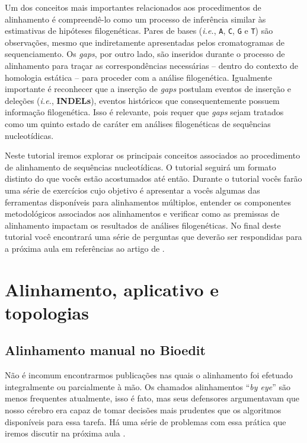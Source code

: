 \begin{refsection}
Um dos conceitos mais importantes relacionados aos procedimentos de alinhamento é compreendê-lo como um processo de inferência similar às estimativas de hipóteses filogenéticas. Pares de bases (\textit{i.e.}, \texttt{A}, \texttt{C}, \texttt{G} e \texttt{T}) são observações, mesmo que indiretamente apresentadas pelos cromatogramas de sequenciamento. Os \textit{gaps}, por outro lado, são inseridos durante o processo de alinhamento para traçar as correspondências necessárias -- dentro do contexto de homologia estática \parencite{Wheeler_2001} -- para proceder com a análise filogenética. Igualmente importante é reconhecer que a inserção de \textit{gaps} postulam eventos de inserção e deleções (\textit{i.e.}, \textbf{INDELs}), eventos históricos que consequentemente possuem informação filogenética. Isso é relevante, pois requer que \textit{gaps} sejam tratados como um quinto estado de caráter em análises filogenéticas de sequências nucleotídicas.

Neste tutorial iremos explorar os principais conceitos associados ao procedimento de alinhamento de sequências nucleotídicas. O tutorial seguirá um formato distinto do que vocês estão acostumados até então. Durante o tutorial vocês farão uma série de exercícios cujo objetivo é apresentar a vocês algumas das ferramentas disponíveis para alinhamentos múltiplos, entender os componentes metodológicos associados aos alinhamentos e verificar como as premissas de alinhamento impactam os resultados de análises filogenéticas. No final deste tutorial você encontrará uma série de perguntas que deverão ser respondidas para a próxima aula em referências ao artigo de \textcite{Phillips_et_al_2000}.


\section{Alinhamento, aplicativo e topologias}\label{tut8:msa}

\subsection{Alinhamento manual no Bioedit}\label{tut8:msa:man}

Não é incomum encontrarmos publicações nas quais o alinhamento foi efetuado integralmente ou parcialmente à mão. Os chamados alinhamentos ``\textit{by eye}'' são menos frequentes atualmente, isso é fato, mas seus defensores argumentavam que nosso cérebro era capaz de tomar decisões mais prudentes que os algoritmos disponíveis para essa tarefa. Há uma série de problemas com essa prática que iremos discutir na próxima aula \parencite[veja ][]{Phillips_et_al_2000}. \\



\end{refsection}
